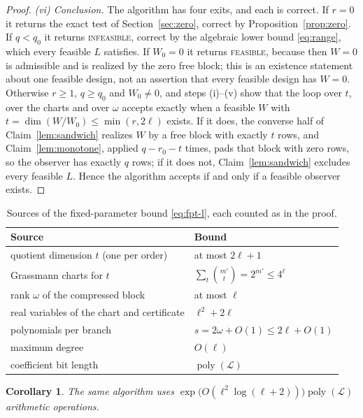 \documentclass[journal]{IEEEtran}
\theoremstyle{plainn}
\newtheorem{cor}[thm]{Corollary}
\theoremstyle{remark}
\begin{document}
\begin{proof}
\emph{(vi) Conclusion.} The algorithm has four exits, and each is correct. If $r=0$ it returns the
exact test of Section~\ref{sec:zero}, correct by Proposition~\ref{prop:zero}. If $q<q_0$ it returns
\textsc{infeasible}, correct by the algebraic lower bound \eqref{eq:range}, which every feasible $L$
satisfies. If $W_0=0$ it returns \textsc{feasible}, because then $W=0$ is admissible and is realized
by the zero free block; this is an existence statement about one feasible design, not an assertion that
every feasible design has $W=0$. Otherwise $r\ge1$, $q\ge q_0$ and $W_0\ne0$, and steps (i)--(v) show that the
loop over $t$, over the charts and over $\omega$ accepts exactly when a feasible $W$ with
$t=\dim(W/W_0)\le\min(r,2\ell)$ exists. If it does, the converse half of Claim~\ref{lem:sandwich}
realizes $W$ by a free block with exactly $t$ rows, and Claim~\ref{lem:monotone}, applied
$q-r_0-t$ times, pads that block with zero rows, so the observer has exactly $q$ rows; if it does
not, Claim~\ref{lem:sandwich} excludes every feasible $L$. Hence the algorithm accepts if and only
if a feasible observer exists.
\end{proof}

\begin{table}[!t]
\centering
\caption{Sources of the fixed-parameter bound \eqref{eq:fpt-l}, each counted as in the proof.}
\label{tab:fptcount}
\footnotesize
\begin{tabular}{@{}ll@{}}
\toprule
Source & Bound \\
\midrule
quotient dimension $t$ (one per order) & at most $2\ell+1$ \\
Grassmann charts for $t$ & $\sum_t\binom{m'}{t}=2^{m'}\le4^{\ell}$ \\
rank $\omega$ of the compressed block & at most $\ell$ \\
real variables of the chart and certificate & $\ell^2+2\ell$ \\
polynomials per branch & $s=2\omega+O(1)\le2\ell+O(1)$ \\
maximum degree & $O(\ell)$ \\
coefficient bit length & $\operatorname{poly}(\mathcal L)$ \\
\bottomrule
\end{tabular}
\end{table}

\begin{cor}\label{cor:arith}
The same algorithm uses $\exp\bigl(O(\ell^2\log(\ell+2))\bigr)\operatorname{poly}(\mathcal L)$
arithmetic operations.
\end{cor}
\end{document}
